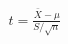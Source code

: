 \documentclass[preview]{standalone}
\begin{document}
\begin{align*}
t = \frac{\bar{X} - \mu}{S / \sqrt{n}}
\end{align*}
\end{document}
